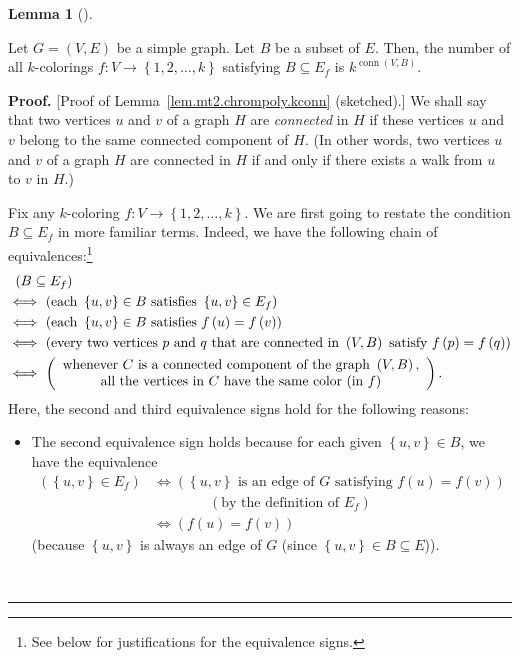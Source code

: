 \documentclass[numbers=enddot,12pt,final,onecolumn,notitlepage]{scrartcl}%
\theoremstyle{definition}
\newtheorem{lem}[theo]{Lemma}
\newenvironment{lemma}[1][]
{\begin{lem}[#1]\begin{leftbar}}
{\end{leftbar}\end{lem}}
\newenvironment{proof}[1][Proof]{\noindent\textbf{#1.} }{\ \rule{0.5em}{0.5em}}
\newcommand{\conn}{\operatorname{conn}}
\newcommand{\set}[1]{\left\{ #1 \right\}}
\newcommand{\tup}[1]{\left( #1 \right)}
\begin{document}
\begin{lemma} \label{lem.mt2.chrompoly.kconn}
Let $G = \tup{V, E}$ be a simple graph.
Let $B$ be a subset of $E$.
Then, the number of all $k$-colorings
$f : V \to \set{1, 2, \ldots, k}$ satisfying $B \subseteq E_f $
is $k^{ \conn \tup{V, B} }$.
\end{lemma}

\begin{proof}
[Proof of Lemma~\ref{lem.mt2.chrompoly.kconn} (sketched).]
We shall say that two vertices $u$ and $v$ of a graph $H$ are
\textit{connected} in $H$ if these vertices $u$ and $v$ belong to the
same connected component of $H$.
(In other words, two vertices $u$ and $v$ of a graph $H$ are connected
in $H$ if and only if there exists a walk from $u$ to $v$ in $H$.)

Fix any $k$-coloring $f : V \to \set{1, 2, \ldots, k} $.
We are first going to restate the condition $B \subseteq E_f$ in more
familiar terms.
Indeed, we have the following chain of equivalences:\footnote{See
  below for justifications for the equivalence signs.}
\begin{align}
&  \ \left(  B\subseteq E_f \right) \nonumber\\
&  \Longleftrightarrow\ \left(  \text{each } \set{u, v} \in B\text{
satisfies } \set{u, v} \in E_f \right) \nonumber\\
&  \Longleftrightarrow\ \left(  \text{each } \set{u, v} \in B\text{
satisfies }f\left(  u\right)  =f\left(  v\right)  \right) \nonumber\\
&  \Longleftrightarrow\ \left(  \text{every two vertices }p\text{ and }q\text{
that are connected in } \tup{V, B} \text{ satisfy }f\left(  p\right)
=f\left(  q\right)  \right) \nonumber\\
&  \Longleftrightarrow\ \left(
\begin{array}[c]{c}
\text{whenever }C\text{ is a connected component of the graph }\left(
V,B\right)  \text{,}\\
\text{all the vertices in }C\text{ have the same color (in }f\text{)}
\end{array}
\right)  .
\label{pf.lem.mt2.chrompoly.kconn.equiv}
\end{align}
Here, the second and third equivalence signs hold for the following
reasons:

\begin{itemize}
\item The second equivalence sign holds because for each given
$\set{u, v} \in B$, we have the equivalence
\begin{align*}
\left(  \set{u, v} \in E_f \right)
& \Longleftrightarrow
   \left( \set{u, v} \text{ is an edge of } G \text{ satisfying }
      f \tup{u} = f \tup{v} \right) \\
&\qquad \qquad \left(\text{by the definition of } E_f \right) \\
& \Longleftrightarrow
   \left( f \tup{u} = f \tup{v} \right)
\end{align*}
(because $\set{u, v}$ is always an edge of $G$
(since $\set{u, v} \in B \subseteq E$)).


\end{itemize}
\end{proof}
\end{document}
